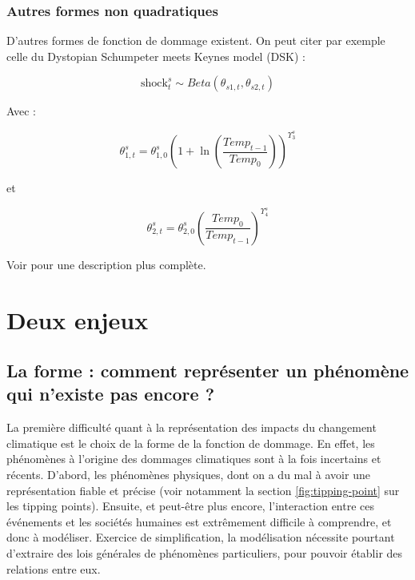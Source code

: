 \subsubsection{Autres formes non quadratiques}

D'autres formes de fonction de dommage existent. On peut citer par exemple celle du Dystopian Schumpeter meets Keynes model (DSK) : 

\begin{equation}
    \text{shock}^s_t \sim Beta(\theta_{s1,t}, \theta_{s2,t})
    \label{eq:DSK1}
\end{equation}

Avec : 

\begin{equation}
   \theta_{1,t}^s = \theta_{1,0}^s (1 + \ln \left( \frac{Temp_{t-1}}{Temp_0} \right))^{\Upsilon_{3}^s}
    \label{eq:DSK2}
\end{equation}

et 

\begin{equation}
   \theta_{2,t}^s = \theta_{2,0}^s \left( \frac{Temp_0}{Temp_{t-1}} \right)^{\Upsilon_{4}^s} 
    \label{eq:DSK3}
\end{equation}

Voir \autocite{reissl_dsk-sfc_2024} pour une description plus complète. 
 
\section{Deux enjeux}


\subsection{La forme : comment représenter un phénomène qui n'existe pas encore ?}
\label{ss:forme}

La première difficulté quant à la représentation des impacts du changement climatique est le choix de la forme de la fonction de dommage. En effet, les phénomènes à l'origine des dommages climatiques sont à la fois incertains et récents. D'abord, les phénomènes physiques, dont on a du mal à avoir une représentation fiable et précise (voir notamment la section \ref{fig:tipping-point} sur les tipping points). Ensuite, et peut-être plus encore, l'interaction entre ces événements et les sociétés humaines est extrêmement difficile à comprendre, et donc à modéliser. Exercice de simplification, la modélisation nécessite pourtant d'extraire des lois générales de phénomènes particuliers, pour pouvoir établir des relations entre eux. \\

